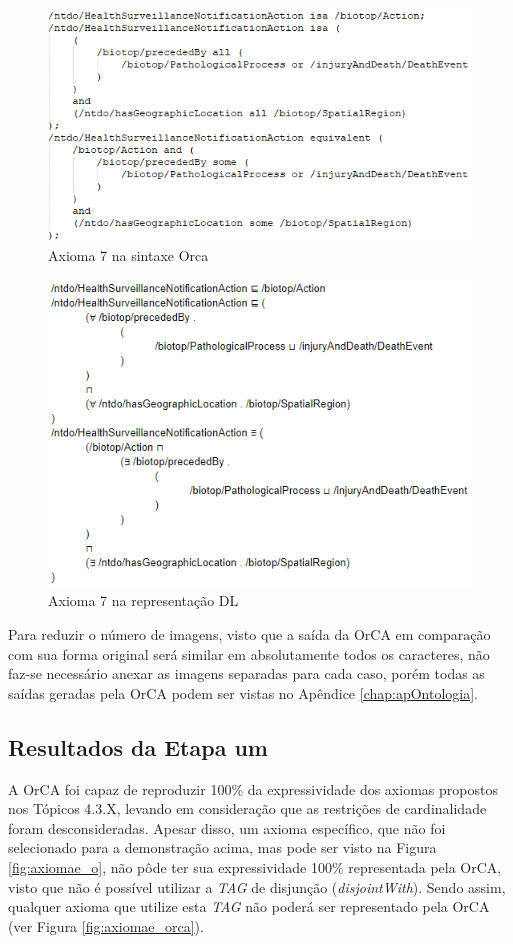 \documentclass{bcc}
\begin{document}
\begin{figure}[H]
\centering
\includegraphics[width=.7\textwidth]{Figuras/axioma7_orca.png}
\caption{Axioma 7 na sintaxe Orca} 
\label{fig:axioma7_orca}
\end{figure}

\begin{figure}[H]
\centering
\includegraphics[width=.7\textwidth]{Figuras/axioma7_dl.png}
\caption{Axioma 7 na representação DL} 
\label{fig:axioma7_dl}
\end{figure}


Para reduzir o número de imagens, visto que a saída da OrCA em comparação com sua forma original será similar em absolutamente todos os caracteres, não faz-se necessário anexar as imagens separadas para cada caso, porém todas as saídas geradas pela OrCA podem ser vistas no Apêndice \ref{chap:apOntologia}.

\subsection{Resultados da Etapa um}
A OrCA foi capaz de reproduzir 100\% da expressividade dos axiomas propostos nos Tópicos 4.3.X, levando em consideração que as restrições de cardinalidade foram desconsideradas. Apesar disso, um axioma específico, que não foi selecionado para a demonstração acima, mas pode ser visto na Figura \ref{fig:axiomae_o}, não pôde ter sua expressividade 100\% representada pela OrCA, visto que não é possível utilizar a \textit{TAG} de disjunção (\textit{disjointWith}). Sendo assim, qualquer axioma que utilize esta \textit{TAG} não poderá ser representado pela OrCA (ver Figura \ref{fig:axiomae_orca}).
\end{document}
